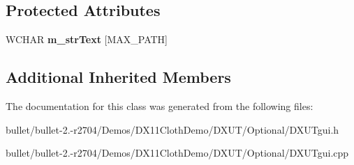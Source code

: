 \subsection*{Protected Attributes}
\begin{DoxyCompactItemize}
\item 
\hypertarget{class_c_d_x_u_t_static_a196a0036e5d50df0986db5537c9e05d4}{W\+C\+H\+A\+R {\bfseries m\+\_\+str\+Text} \mbox{[}M\+A\+X\+\_\+\+P\+A\+T\+H\mbox{]}}\label{class_c_d_x_u_t_static_a196a0036e5d50df0986db5537c9e05d4}

\end{DoxyCompactItemize}
\subsection*{Additional Inherited Members}


The documentation for this class was generated from the following files\+:\begin{DoxyCompactItemize}
\item 
bullet/bullet-\/2.-\/r2704/\+Demos/\+D\+X11\+Cloth\+Demo/\+D\+X\+U\+T/\+Optional/D\+X\+U\+Tgui.\+h\item 
bullet/bullet-\/2.-\/r2704/\+Demos/\+D\+X11\+Cloth\+Demo/\+D\+X\+U\+T/\+Optional/D\+X\+U\+Tgui.\+cpp\end{DoxyCompactItemize}
